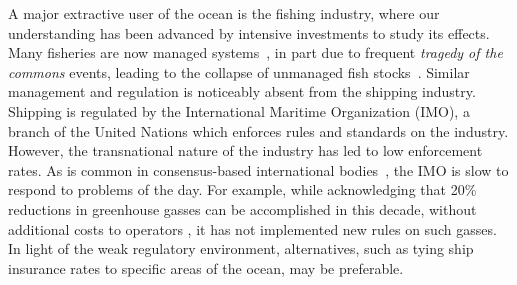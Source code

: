 
A major extractive user of the ocean is the fishing industry, where our understanding has been advanced by intensive investments to study its effects. %
Many fisheries are now managed systems~\citep{worm2009rebuilding}, in part due to frequent \textit{tragedy of the commons} events, leading to the collapse of unmanaged fish stocks~\citep{costello2012status}. %
Similar management and regulation is noticeably absent from the shipping industry.
  Shipping is regulated by the International Maritime Organization (IMO), a branch of the United Nations which enforces rules and standards on the industry. However, the transnational nature of the industry has led to low enforcement rates. As is common in consensus-based international bodies~\citep{cogan2009representation}, the IMO is slow to respond to problems of the day. 
  For example, while acknowledging that 20\% reductions in greenhouse gasses can be accomplished in this decade, without additional costs to operators \citep{imo2009}, it has not implemented new rules on such gasses.  In light of the weak regulatory environment, alternatives, such as tying ship insurance rates to specific areas of the ocean, may be preferable.

